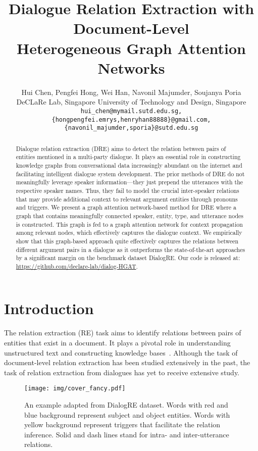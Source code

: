 \documentclass[11pt]{article}
\title{Dialogue Relation Extraction with Document-Level \\ Heterogeneous Graph Attention Networks}
\author{Hui Chen, Pengfei Hong, Wei Han, Navonil Majumder, Soujanya Poria \\
  DeCLaRe Lab, Singapore University of Technology and Design, Singapore \\
  \texttt{hui\_chen@mymail.sutd.edu.sg,}\\
  \texttt{\{hongpengfei.emrys,henryhan88888\}@gmail.com,}\\
  \texttt{\{navonil\_majumder,sporia\}@sutd.edu.sg}\\}
\begin{document}
\maketitle
\begin{abstract}
Dialogue relation extraction (DRE) aims to detect the relation between pairs of entities mentioned in a multi-party dialogue. It plays an essential role in constructing knowledge graphs from conversational data increasingly abundant on the internet and facilitating intelligent dialogue system development. The prior methods of DRE do not meaningfully leverage speaker information---they just prepend the utterances with the respective speaker names. Thus, they fail to model the crucial inter-speaker relations that may provide additional context to relevant argument entities through pronouns and triggers. We present a graph attention network-based method for DRE where a graph that contains meaningfully connected speaker, entity, type, and utterance nodes is constructed. This graph is fed to a graph attention network for context propagation among relevant nodes, which effectively captures the dialogue context. We empirically show that this graph-based approach quite effectively captures the relations between different argument pairs in a dialogue as it outperforms the state-of-the-art approaches by a significant margin on the benchmark dataset DialogRE. Our code is released at: \url{https://github.com/declare-lab/dialog-HGAT}.
\end{abstract}


\section{Introduction}
The relation extraction (RE) task aims to identify relations between pairs of entities that exist in a document. It plays a pivotal role in understanding unstructured text and constructing knowledge bases~\cite{peng2017cross,quirk2017distant}.
Although the task of document-level relation extraction has been studied extensively in the past, the task of relation extraction from dialogues has yet to receive extensive study.

\begin{figure}[t]
\centering
\texttt{[image: img/cover\_fancy.pdf]}
\caption{An example adapted from DialogRE dataset. Words with red and blue background represent subject and object entities. Words with yellow background represent triggers that facilitate the relation inference. Solid and dash lines stand for intra- and inter-utterance relations.}
\label{fig1}
\end{figure}
\end{document}
